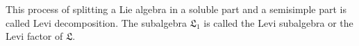 This process of splitting a Lie algebra in a soluble part and a semisimple part
is called Levi decomposition. The subalgebra $\mathfrak{L}_1$ is called the Levi
subalgebra or the Levi factor of $\mathfrak{L}$.
